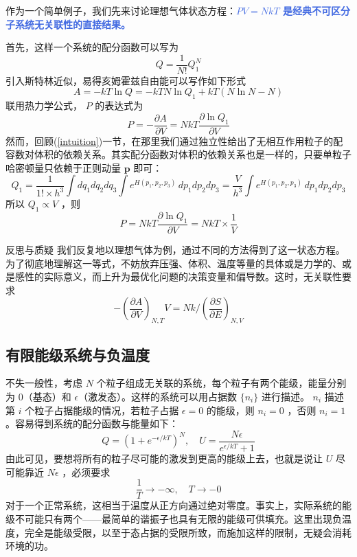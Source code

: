 作为一个简单例子，我们先来讨论理想气体状态方程：\textcolor{RoyalBlue}{\textbf{\kaishu $PV = NkT$ 是经典不可区分子系统无关联性的直接结果。}}

首先，这样一个系统的配分函数可以写为
\[
    Q = \frac{1}{N!} Q_1^N
\]
引入斯特林近似，易得亥姆霍兹自由能可以写作如下形式
\[
    A = -kT\ln Q = -kT N \ln Q_1 + kT(N\ln N - N)
\]
联用热力学公式， $P$ 的表达式为
\[
    P = - \frac{\partial A}{\partial V} = NkT \frac{\partial \ln Q_1}{\partial V}
\]
然而，回顾(\ref*{intuition})一节，在那里我们通过独立性给出了无相互作用粒子的配容数对体积的依赖关系。其实配分函数对体积的依赖关系也是一样的，只要单粒子哈密顿量只依赖于正则动量 $\bm{p}$ 即可：
\[
    Q_1 = \frac{1}{1!\times h^3}\int dq_1dq_2dq_3\int e^{H(p_1,p_2,p_3)}\,dp_1dp_2dp_3  = \frac{V}{h^3} \int e^{H(p_1,p_2,p_3)}\,dp_1dp_2dp_3
\]
所以 $Q_1 \propto V$ ，则
\[
    P = NkT \frac{\partial \ln Q_1}{\partial V} = NkT \times \frac{1}{V} 
\]
\begin{justification}{\kaishu 反思与质疑}
\kaishu \fontsize{11pt}{16pt}
    \quad\quad 我们反复地以理想气体为例，通过不同的方法得到了这一状态方程。为了彻底地理解这一等式，不妨放弃压强、体积、温度等量的具体或是力学的、或是感性的实际意义，而上升为最优化问题的决策变量和偏导数。这时，无关联性要求
    \[
        -\left(\frac{\partial A}{\partial V}\right)_{N,T} V = Nk \bigg/ \left(\frac{\partial S}{\partial E} \right)_{N,V}
    \]
\end{justification}

\subsection{有限能级系统与负温度}

不失一般性，考虑 $N$ 个粒子组成无关联的系统，每个粒子有两个能级，能量分别为 $0$（基态）和 $\epsilon$（激发态）。这样的系统可以用占据数 $\{n_i\}$ 进行描述。 $n_i $ 描述第 $i$ 个粒子占据能级的情况，若粒子占据 $\epsilon  = 0$ 的能级，则 $n_i = 0$ ，否则 $n_i = 1$ 。容易得到系统的配分函数与能量如下：
\begin{equation}
    Q = (1+ e^{-\epsilon / kT})^N, \quad U = \frac{N\epsilon}{e^{\epsilon / kT} + 1}
\end{equation}
由此可见，要想将所有的粒子尽可能的激发到更高的能级上去，也就是说让 $U$ 尽可能靠近 $N\epsilon$ ，必须要求
\[
    \frac{1}{T} \rightarrow -\infty,\quad T \rightarrow -0
\]
对于一个正常系统，这相当于温度从正方向通过绝对零度。事实上，实际系统的能级不可能只有两个——最简单的谐振子也具有无限的能级可供填充。这里出现负温度，完全是能级受限，以至于态占据的受限所致，而施加这样的限制，无疑会消耗环境的功。

